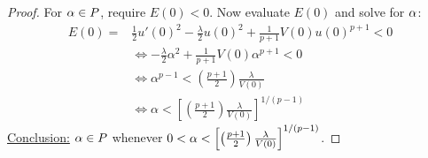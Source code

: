 \begin{lemma}
\begin{proof}
For $\alpha\in P$, require $E(0)<0$.
Now evaluate $E(0)$ and solve for $\alpha$:
\begin{align*}
  E(0)=&\frac{1}{2}u'(0)^2-\frac{\lambda}{2}u(0)^2+\frac{1}{p+1}V(0)u(0)^{p+1}<0\\
  &\iff -\frac{\lambda}{2}\alpha^2+\frac{1}{p+1}V(0)\alpha^{p+1}<0\\
  &\iff\alpha^{p-1}<\left(\frac{p+1}{2}\right)\frac{\lambda}{V(0)}\\
  &\iff\alpha<\left[\left(\frac{p+1}{2}\right)\frac{\lambda}{V(0)} \right]^{1/(p-1)}
\end{align*}
\underline{Conclusion:} $\alpha\in P$ whenever $0<\alpha<\left[\left(\frac{p+1}{2}\right)\frac{\lambda}{V(0)}\right]^{1/(p-1)}$.


\end{proof}
\end{lemma}

